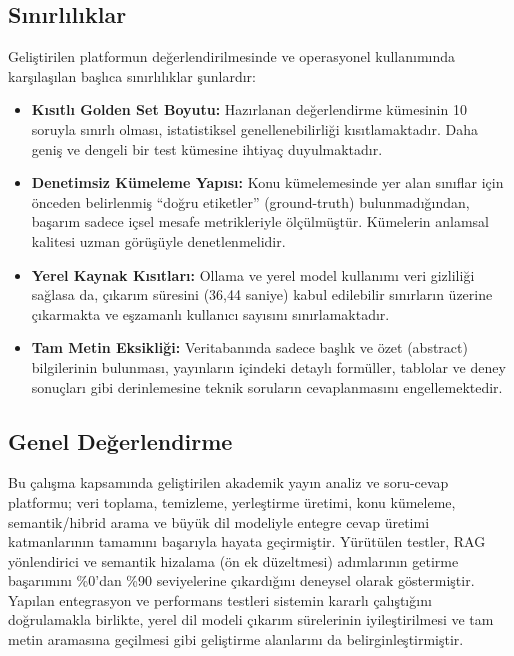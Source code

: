 \subsection{Sınırlılıklar}
Geliştirilen platformun değerlendirilmesinde ve operasyonel kullanımında karşılaşılan başlıca sınırlılıklar şunlardır:
\begin{itemize}
    \item \textbf{Kısıtlı Golden Set Boyutu:} Hazırlanan değerlendirme kümesinin 10 soruyla sınırlı olması, istatistiksel genellenebilirliği kısıtlamaktadır. Daha geniş ve dengeli bir test kümesine ihtiyaç duyulmaktadır.
    \item \textbf{Denetimsiz Kümeleme Yapısı:} Konu kümelemesinde yer alan sınıflar için önceden belirlenmiş ``doğru etiketler'' (ground-truth) bulunmadığından, başarım sadece içsel mesafe metrikleriyle ölçülmüştür. Kümelerin anlamsal kalitesi uzman görüşüyle denetlenmelidir.
    \item \textbf{Yerel Kaynak Kısıtları:} Ollama ve yerel model kullanımı veri gizliliği sağlasa da, çıkarım süresini (36,44 saniye) kabul edilebilir sınırların üzerine çıkarmakta ve eşzamanlı kullanıcı sayısını sınırlamaktadır.
    \item \textbf{Tam Metin Eksikliği:} Veritabanında sadece başlık ve özet (abstract) bilgilerinin bulunması, yayınların içindeki detaylı formüller, tablolar ve deney sonuçları gibi derinlemesine teknik soruların cevaplanmasını engellemektedir.
\end{itemize}

\subsection{Genel Değerlendirme}
Bu çalışma kapsamında geliştirilen akademik yayın analiz ve soru-cevap platformu; veri toplama, temizleme, yerleştirme üretimi, konu kümeleme, semantik/hibrid arama ve büyük dil modeliyle entegre cevap üretimi katmanlarının tamamını başarıyla hayata geçirmiştir. Yürütülen testler, RAG yönlendirici ve semantik hizalama (ön ek düzeltmesi) adımlarının getirme başarımını \%0'dan \%90 seviyelerine çıkardığını deneysel olarak göstermiştir. Yapılan entegrasyon ve performans testleri sistemin kararlı çalıştığını doğrulamakla birlikte, yerel dil modeli çıkarım sürelerinin iyileştirilmesi ve tam metin aramasına geçilmesi gibi geliştirme alanlarını da belirginleştirmiştir.
